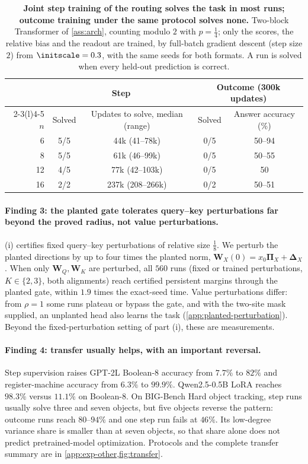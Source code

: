 \begin{table}[t]
\caption{\textbf{Joint step training of the routing solves the task in most runs; outcome training under the same protocol solves
none.} Two-block Transformer of \cref{ass:arch}, counting modulo $2$ with $p=\tfrac{1}{4}$; only the scores, the relative bias and the
readout are trained, by full-batch gradient descent (step size $2$) from $\initscale=0.3$, with the same seeds for both formats. A run is
solved when every held-out prediction is correct.}
\label{tab:reach}
\centering\small
\begin{tabular}{@{}rcccc@{}}
\toprule
 & \multicolumn{2}{c}{Step} & \multicolumn{2}{c}{Outcome (300k updates)}\\
\cmidrule(lr){2-3}\cmidrule(l){4-5}
$n$ & Solved & Updates to solve, median (range) & Solved & Answer accuracy (\%)\\
\midrule
6  & 5/5 & 44k (41--78k)   & 0/5 & 50--94\\
8  & 5/5 & 61k (46--99k)   & 0/5 & 50--55\\
12 & 4/5 & 77k (42--103k)  & 0/5 & 50\\
16 & 2/2 & 237k (208--266k) & 0/2 & 50--51\\
\bottomrule
\end{tabular}
\end{table}

\paragraph{Finding 3: the planted gate tolerates query--key perturbations far beyond the proved radius, not value perturbations.}
(i) certifies fixed query--key perturbations of relative size $\frac18$. We perturb the planted directions by up to
four times the planted norm, $\mathbf W_X(0)=x_0\bm\Pi_X+\bm\Delta_X$. When only $\mathbf W_Q,\mathbf W_K$ are perturbed, all $560$ runs
(fixed or trained perturbations, $K\in\{2,3\}$, both alignments) reach certified persistent margins through the planted gate, within
$1.9$ times the exact-seed time. Value perturbations differ: from $\rho=1$ some runs plateau or bypass the gate, and with the two-site
mask supplied, an unplanted head also learns the task (\cref{app:planted-perturbation}). Beyond the fixed-perturbation setting of part (i), these are measurements.

\paragraph{Finding 4: transfer usually helps, with an important reversal.}
Step supervision raises GPT-2L Boolean-8 accuracy from $7.7\%$ to $82\%$ and register-machine
accuracy from $6.3\%$ to $99.9\%$. Qwen2.5-0.5B LoRA reaches $98.3\%$ versus $11.1\%$
on Boolean-8. On BIG-Bench Hard object tracking, step runs usually solve three and seven
objects, but five objects reverse the pattern: outcome runs reach $80$--$94\%$ and one
step run fails at $46\%$. Its low-degree variance share is smaller than at seven objects,
so that share alone does not predict pretrained-model optimization. Protocols and the
complete transfer summary are in \cref{app:exp-other,fig:transfer}.

